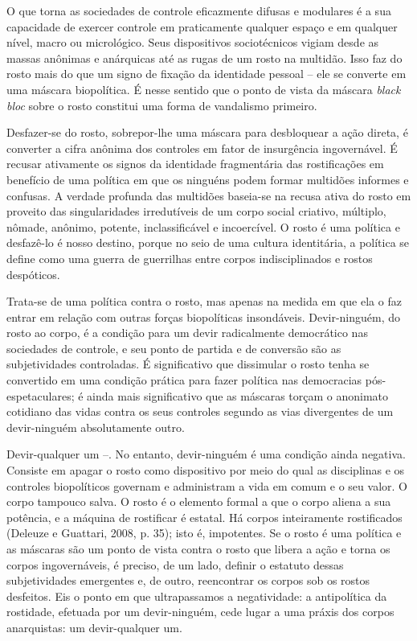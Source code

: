 O que torna as sociedades de controle eficazmente difusas e modulares é
a sua capacidade de exercer controle em praticamente qualquer espaço e
em qualquer nível, macro ou micrológico. Seus dispositivos sociotécnicos
vigiam desde as massas anônimas e anárquicas até as rugas de um rosto na
multidão. Isso faz do rosto mais do que um signo de fixação da
identidade pessoal -- ele se converte em uma máscara biopolítica. É
nesse sentido que o ponto de vista da máscara \emph{black bloc} sobre o
rosto constitui uma forma de vandalismo primeiro.

Desfazer-se do rosto, sobrepor-lhe uma máscara para desbloquear a ação
direta, é converter a cifra anônima dos controles em fator de
insurgência ingovernável. É recusar ativamente os signos da identidade
fragmentária das rostificações em benefício de uma política em que os
ninguéns podem formar multidões informes e confusas. A verdade profunda
das multidões baseia-se na recusa ativa do rosto em proveito das
singularidades irredutíveis de um corpo social criativo, múltiplo,
nômade, anônimo, potente, inclassificável e incoercível. O rosto é uma
política e desfazê-lo é nosso destino, porque no seio de uma cultura
identitária, a política se define como uma guerra de guerrilhas entre
corpos indisciplinados e rostos despóticos.

Trata-se de uma política contra o rosto, mas apenas na medida em que ela
o faz entrar em relação com outras forças biopolíticas insondáveis.
Devir-ninguém, do rosto ao corpo, é a condição para um devir
radicalmente democrático nas sociedades de controle, e seu ponto de
partida e de conversão são as subjetividades controladas. É
significativo que dissimular o rosto tenha se convertido em uma condição
prática para fazer política nas democracias pós-espetaculares; é ainda
mais significativo que as máscaras torçam o anonimato cotidiano das
vidas contra os seus controles segundo as vias divergentes de um
devir-ninguém absolutamente outro.

Devir-qualquer um --. No entanto, devir-ninguém é uma condição ainda
negativa. Consiste em apagar o rosto como dispositivo por meio do qual
as disciplinas e os controles biopolíticos governam e administram a vida
em comum e o seu valor. O corpo tampouco salva. O rosto é o elemento
formal a que o corpo aliena a sua potência, e a máquina de rostificar é
estatal. Há corpos inteiramente rostificados (Deleuze e Guattari, 2008,
p. 35); isto é, impotentes. Se o rosto é uma política e as máscaras são
um ponto de vista contra o rosto que libera a ação e torna os corpos
ingovernáveis, é preciso, de um lado, definir o estatuto dessas
subjetividades emergentes e, de outro, reencontrar os corpos sob os
rostos desfeitos. Eis o ponto em que ultrapassamos a negatividade: a
antipolítica da rostidade, efetuada por um devir-ninguém, cede lugar a
uma práxis dos corpos anarquistas: um devir-qualquer um.

